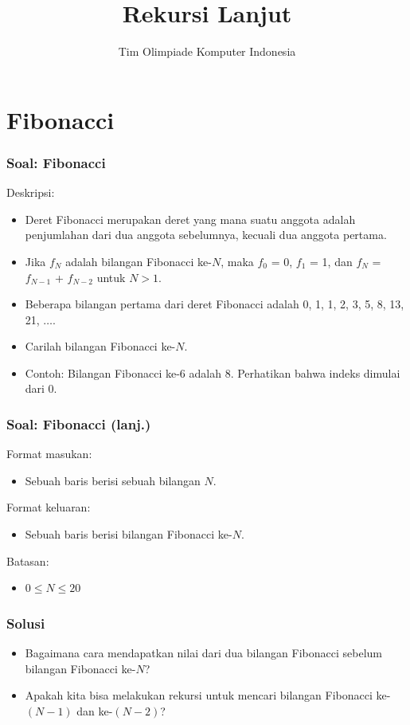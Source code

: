 

\title{Rekursi Lanjut}
\author{Tim Olimpiade Komputer Indonesia}
\date{}



\begin{frame}
\titlepage
\end{frame}

\section{Fibonacci}
\frame{\sectionpage}

\begin{frame}
\frametitle{Soal: Fibonacci}
Deskripsi:
\begin{itemize}
  \item Deret Fibonacci merupakan deret yang mana suatu anggota adalah penjumlahan dari dua anggota sebelumnya, kecuali dua anggota pertama.
  \item Jika $f_N$ adalah bilangan Fibonacci ke-$N$, maka $f_0$ = 0, $f_1$ = 1, dan $f_N$ = $f_{N-1}$ + $f_{N-2}$ untuk $N > 1$.
  \item Beberapa bilangan pertama dari deret Fibonacci adalah 0, 1, 1, 2, 3, 5, 8, 13, 21, $\dots$.
  \item Carilah bilangan Fibonacci ke-$N$.
  \item Contoh: Bilangan Fibonacci ke-6 adalah 8. Perhatikan bahwa indeks dimulai dari 0.
\end{itemize}
\end{frame}

\begin{frame}
\frametitle{Soal: Fibonacci (lanj.) }
Format masukan:
\begin{itemize}
    \item Sebuah baris berisi sebuah bilangan $N$.
\end{itemize}
Format keluaran:
\begin{itemize}
    \item Sebuah baris berisi bilangan Fibonacci ke-$N$.
\end{itemize}
Batasan:
\begin{itemize}
    \item $0 \le N \le 20$
\end{itemize}
\end{frame}

\begin{frame}
\frametitle{Solusi}
\begin{itemize}
  \item Bagaimana cara mendapatkan nilai dari dua bilangan Fibonacci sebelum bilangan Fibonacci ke-$N$?
  \item Apakah kita bisa melakukan rekursi untuk mencari bilangan Fibonacci ke-$(N-1)$ dan ke-$(N-2)$?
\end{itemize}
\end{frame}


